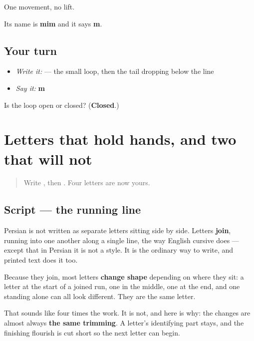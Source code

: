 One movement, no lift.

Its name is \textbf{mim} and it says \textbf{m}.

\subsection*{Your turn}
\begin{itemize}
\raggedright
  \item \emph{Write it:}  — the small loop, then the tail dropping below the line
  \item \emph{Say it:} \textbf{m}
\end{itemize}

\begin{tcolorbox}[breakable,colback=teal!4,colframe=teal!35!black,title={Before you move on}]
Is the loop open or closed? (\textbf{Closed}.)
\end{tcolorbox}
\section[\texorpdfstring{\fa{سلام} (salâm)}{سلام (salâm)}]{Letters that hold hands, and two that will not}

\label{lesson:FA-W15-joining}



\begin{quote}
Write , then . Four letters are now yours.
\end{quote}

\subsection*{Script — the running line}
Persian is not written as separate letters sitting side by side. Letters \textbf{join}, running into one another along a single line, the way English cursive does — except that in Persian it is not a style. It is the ordinary way to write, and printed text does it too.

Because they join, most letters \textbf{change shape} depending on where they sit: a letter at the start of a joined run, one in the middle, one at the end, and one standing alone can all look different. They are the same letter.

That sounds like four times the work. It is not, and here is why: the changes are almost always \textbf{the same trimming}. A letter's identifying part stays, and the finishing flourish is cut short so the next letter can begin.

